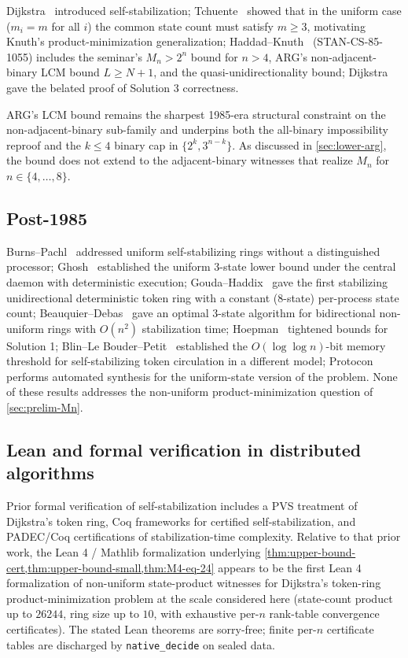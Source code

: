 \documentclass[11pt,a4paper]{article}
\theoremstyle{plain}
\theoremstyle{definition}
\newcommand{\Mn}{M_n}
\begin{document}
Dijkstra~\cite{Dijkstra1974} introduced self-stabilization;
Tchuente~\cite{Tchuente1981} showed that in the uniform case
($m_i = m$ for all $i$) the common state count must satisfy
$m \ge 3$, motivating Knuth's product-minimization generalization; Haddad--Knuth~\cite{HaddadKnuth1985} (STAN-CS-85-1055)
includes the seminar's $\Mn > 2^n$ bound for $n > 4$, ARG's
non-adjacent-binary LCM bound $L \ge N + 1$, and the
quasi-unidirectionality bound; Dijkstra~\cite{Dijkstra1986} gave the
belated proof of Solution 3 correctness.

ARG's LCM bound remains the sharpest 1985-era structural constraint on
the non-adjacent-binary sub-family and underpins both the all-binary
impossibility reproof and the $k \le 4$ binary cap in
$\{2^k, 3^{n-k}\}$.  As discussed in \cref{sec:lower-arg}, the bound
does not extend to the adjacent-binary witnesses that realize $\Mn$ for
$n \in \{4, \ldots, 8\}$.

\subsection{Post-1985}\label{sec:related-post1985}

Burns--Pachl~\cite{BurnsPachl1989} addressed uniform self-stabilizing
rings without a distinguished processor; Ghosh~\cite{Ghosh1993}
established the uniform 3-state lower bound under the central daemon
with deterministic execution; Gouda--Haddix~\cite{GoudaHaddix1996} gave
the first stabilizing unidirectional deterministic token ring with a
constant ($8$-state) per-process state count;
Beauquier--Debas~\cite{BeauquierDebas1995} gave an optimal $3$-state
algorithm for bidirectional non-uniform rings with $O(n^2)$
stabilization time; Hoepman~\cite{Hoepman1999} tightened bounds for
Solution 1; Blin--Le Bouder--Petit~\cite{BlinLeBouderPetit2024}
established the $O(\log \log n)$-bit memory threshold for
self-stabilizing token circulation in a different model;
Protocon~\cite{KlinkhamerEbnenasir2013} performs automated synthesis for the
uniform-state version of the problem.  None of these results addresses
the non-uniform product-minimization question of
\cref{sec:prelim-Mn}.

\subsection{Lean and formal verification in distributed algorithms}\label{sec:related-formal}

Prior formal verification of self-stabilization includes a PVS
treatment of Dijkstra's token ring, Coq frameworks for certified
self-stabilization, and PADEC/Coq certifications of stabilization-time
complexity.  Relative to that prior work, the Lean 4 / Mathlib
formalization underlying
\cref{thm:upper-bound-cert,thm:upper-bound-small,thm:M4-eq-24} appears
to be the first Lean 4 formalization of non-uniform
state-product witnesses for Dijkstra's token-ring product-minimization
problem at the scale considered here (state-count product up to
$26244$, ring size up to $10$, with exhaustive per-$n$ rank-table
convergence certificates).  The stated Lean theorems are
sorry-free; finite per-$n$ certificate tables are discharged by
\texttt{native\_decide} on sealed data.
\end{document}
